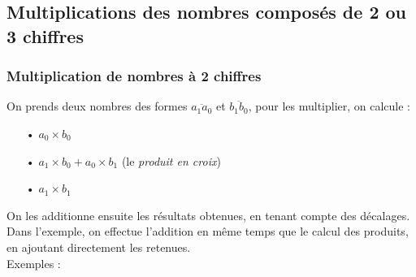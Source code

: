 \documentclass[a4paper, twoside]{article}
\begin{document}
		\vfill

		\newpage





		\subsection{Multiplications des nombres composés de 2 ou 3 chiffres}

		\subsubsection*{Multiplication de nombres à 2 chiffres}

		{ \parindent=0.5cm On prends deux nombres des formes $\overline{a_1a_0}$ et $\overline{b_1b_0}$, pour les multiplier, on calcule :}

		\begin{itemize}

			\item[•] $a_0 \times b_0$
			\item[•] $a_1 \times b_0 + a_0 \times b_1$ (le \textit{produit en croix})
			\item[•] $a_1 \times b_1$\\
			
		\end{itemize}

		On les additionne ensuite les résultats obtenues, en tenant compte des décalages. Dans l'exemple, on effectue l'addition en même temps que le calcul des produits, en ajoutant directement les retenues. \\

		{ \parindent=0.5cm Exemples : }
\end{document}
